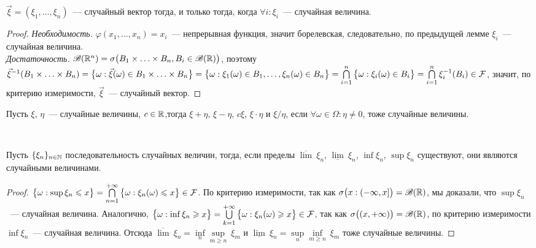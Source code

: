 \begin{lemma}
	$\vec \xi = (\xi_1, \ldots, \xi_n)$~--- случайный вектор тогда, и только тогда, когда $\forall i : \xi_i$~--- случайная величина.
	\begin{proof}
		\emph{Необходимость.} $\varphi(x_1, \ldots, x_n) = x_i$~--- непрерывная функция, значит борелевская, следовательно, по предыдущей лемме $\xi_i$~--- случайная величина. \\
		\emph{Достаточность.} $\mathscr{B}(\mathbb{R}^n) = \sigma\big(B_1 \times \ldots \times B_n, B_i \in \mathscr{B}(\mathbb{R})\big)$, поэтому $\vec\xi^{-1}(B_1 \times \ldots \times B_n) = \big\{\omega : \vec\xi(\omega) \in B_1 \times \ldots \times B_n\big\} = \big\{\omega : \xi_1(\omega) \in B_1, \ldots, \xi_n(\omega) \in B_n\big\} = \bigcap\limits_{i = 1}^n\big\{\omega: \xi_i(\omega) \in B_i \big\} = \bigcap\limits_{i = 1}^n \xi_i^{-1}(B_i) \in \mathcal{F}$, значит, по критерию измеримости, $\vec \xi$~--- случайный вектор.
	\end{proof}
\end{lemma}

\begin{consequence}
	Пусть $\xi$, $\eta$~--- случайные величины, $c \in \mathbb{R}$,тогда $\xi + \eta$, $\xi - \eta$, $c\xi$, $\xi \cdot \eta$ и $\xi / \eta$, если $\forall \omega \in \Omega : \eta \neq 0$, тоже случайные величины.
\end{consequence}

\begin{lemma}~

	Пусть $\{ \xi_n \}_{n \in \mathbb{N}}$ последовательность случайных величин, тогда, если пределы $\overline{\lim}~\xi_n$, $\underline{\lim}~\xi_n$, $\inf\xi_n$, $\sup\xi_n$ существуют, они являются случайными величинами.
	\begin{proof}
		$\big\{\omega : \sup \xi_n \leqslant x \big\} = \bigcap\limits_{n = 1}^{+\infty}\big\{\omega : \xi_n(\omega) \leqslant x \big\} \in \mathcal{F}$. По критерию измеримости, так как $\sigma\big(x : (-\infty, x]\big) = \mathscr{B}(\mathbb{R})$, мы доказали, что $\sup\xi_n$~--- случайная величина. Аналогично, $\big\{\omega : \inf \xi_n \geqslant x \big\} = \bigcup\limits_{k = 1}^{+\infty}\big\{\omega : \xi_n(\omega) \geqslant x \big\} \in \mathcal{F}$, так как $\sigma\big((x, +\infty)\big) = \mathscr{B}(\mathbb{R})$, по критерию измеримости $\inf\xi_n$~--- случайная величина. Отсюда $\overline{\lim}~\xi_n = \inf\limits_n\sup\limits_{m \geqslant n}~\xi_m$ и $\underline{\lim}~\xi_n = \sup\limits_n\inf\limits_{m \geqslant n}~\xi_m$ тоже случайные величины.
	\end{proof}
\end{lemma}

